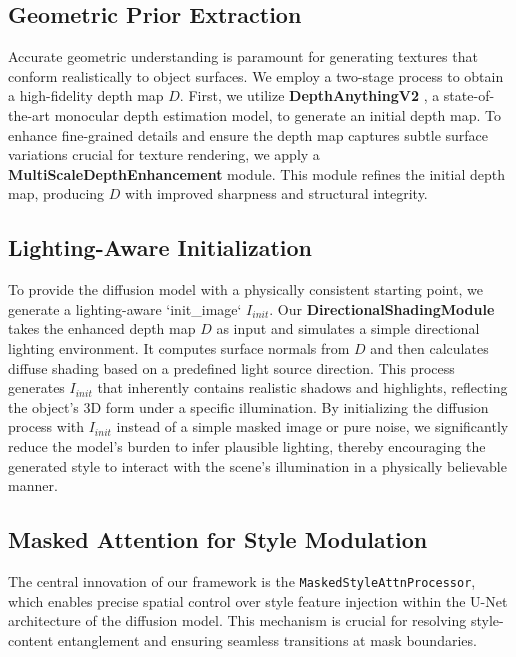 \subsection{Geometric Prior Extraction}

Accurate geometric understanding is paramount for generating textures that conform realistically to object surfaces. We employ a two-stage process to obtain a high-fidelity depth map $D$. First, we utilize \textbf{DepthAnythingV2} \cite{li2024depthanythingv2}, a state-of-the-art monocular depth estimation model, to generate an initial depth map. To enhance fine-grained details and ensure the depth map captures subtle surface variations crucial for texture rendering, we apply a \textbf{MultiScaleDepthEnhancement} module. This module refines the initial depth map, producing $D$ with improved sharpness and structural integrity.

\subsection{Lighting-Aware Initialization}

To provide the diffusion model with a physically consistent starting point, we generate a lighting-aware `init_image` $I_{init}$. Our \textbf{DirectionalShadingModule} takes the enhanced depth map $D$ as input and simulates a simple directional lighting environment. It computes surface normals from $D$ and then calculates diffuse shading based on a predefined light source direction. This process generates $I_{init}$ that inherently contains realistic shadows and highlights, reflecting the object's 3D form under a specific illumination. By initializing the diffusion process with $I_{init}$ instead of a simple masked image or pure noise, we significantly reduce the model's burden to infer plausible lighting, thereby encouraging the generated style to interact with the scene's illumination in a physically believable manner.

\subsection{Masked Attention for Style Modulation}

The central innovation of our framework is the \texttt{MaskedStyleAttnProcessor}, which enables precise spatial control over style feature injection within the U-Net architecture of the diffusion model. This mechanism is crucial for resolving style-content entanglement and ensuring seamless transitions at mask boundaries.

